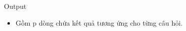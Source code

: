 Output
\begin{itemize}
	\item     Gồm p dòng chứa kết quả tương ứng cho từng câu hỏi.   
\end{itemize}